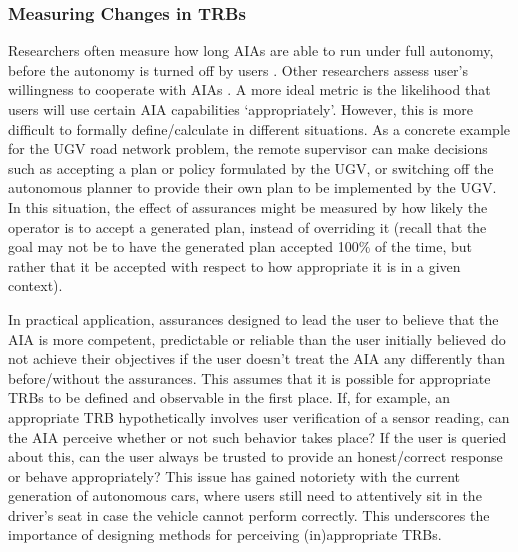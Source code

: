\subsubsection{Measuring Changes in TRBs} Researchers often measure how long AIAs are able to run under full autonomy, before the autonomy is turned off by users \cite{Freedy2007-sg,Desai2012-rc}. 
Other researchers assess user's willingness to cooperate with AIAs \cite{Salem2015-md,Wu2016-ei,Bainbridge2011-pl}. 
A more ideal metric is the likelihood that users will use certain AIA capabilities `appropriately'. 
However, this is more difficult to formally define/calculate in different situations. 
As a concrete example for the UGV road network problem, %
the remote supervisor can make decisions such as accepting a plan or policy formulated by the UGV, or switching off the autonomous planner to provide their own plan to be implemented by the UGV. 
In this situation, the effect of assurances might be measured by how likely the operator is to accept a generated plan, instead of overriding it (recall that the goal may not be to have the generated plan accepted 100\% of the time, but rather that it be accepted with respect to how appropriate it is in a given context).

In practical application, assurances designed to lead the user to believe that the AIA is more competent, predictable or reliable than the user initially believed do not achieve their objectives if the user doesn't treat the AIA any differently than before/without the assurances. 
This assumes that it is possible for appropriate TRBs to be defined and observable in the first place. 
If, for example, an appropriate TRB hypothetically involves user verification of a sensor reading, can the AIA perceive whether or not such behavior takes place? 
If the user is queried about this, can the user always be trusted to provide an honest/correct response or behave appropriately? 
This issue has gained notoriety with the current generation of autonomous cars, where users still need to attentively sit in the driver's seat in case the vehicle cannot perform correctly. This underscores the importance of designing methods for perceiving (in)appropriate TRBs. 
